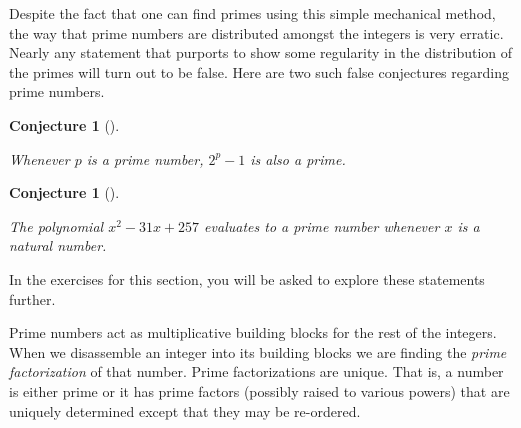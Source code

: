 \documentclass[10pt,]{book}
\theoremstyle{plain}
\newtheorem{conjecture}[theorem]{Conjecture}
\theoremstyle{definition}
\theoremstyle{definition}
\numberwithin{equation}{section}
\begin{document}
    Despite the fact that one can find primes using this simple
    mechanical method, the way that prime numbers are distributed
    amongst the integers is very erratic. Nearly any statement that
    purports to show some regularity in the distribution of the
    primes will turn out to be false. Here are two such false
    conjectures regarding prime numbers.
\begin{conjecture}[{}]\label{conj_ferm}

      Whenever \(p\) is a prime number, \(2^p-1\) is also a prime.
\end{conjecture}
\begin{conjecture}[{}]\label{conj_poly}

      The polynomial \(x^2-31x+257\) evaluates to a prime number
      whenever \(x\) is a natural number.
\end{conjecture}
\par

    In the exercises for this section, you will be asked to
    explore these statements further.
\par

    Prime numbers act as multiplicative building blocks for the rest of
    the integers. When we disassemble an integer into its building blocks
    we are finding the \emph{prime factorization}
    of that number. Prime
    factorizations are unique. That is, a number is either prime or it
    has prime factors (possibly raised to various powers) that are
    uniquely determined \textemdash{} except that they may be re-ordered.
\par
\end{document}
